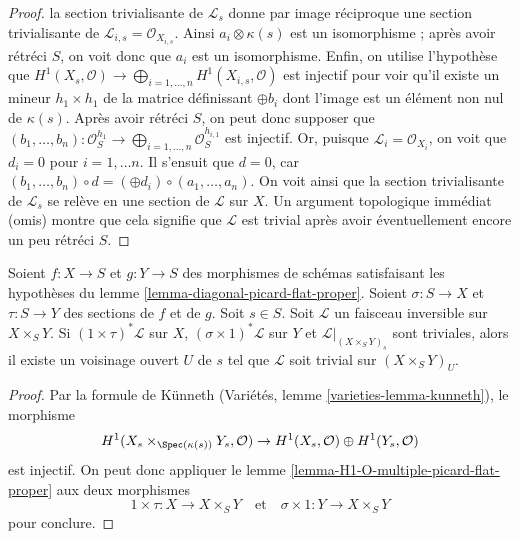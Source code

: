 \begin{proof}
la section trivialisante de $\mathcal{L}_s$ donne par image réciproque une section trivialisante
de $\mathcal{L}_{i, s} = \mathcal{O}_{X_{i, s}}$. Ainsi
$a_i \otimes \kappa(s)$ est un isomorphisme ; après avoir rétréci $S$,
on voit donc que $a_i$ est un isomorphisme. Enfin, on utilise l'hypothèse
que $H^1(X_s, \mathcal{O}) \to
\bigoplus_{i = 1, \ldots, n} H^1(X_{i, s}, \mathcal{O})$
est injectif pour voir qu'il existe un mineur $h_1 \times h_1$ de la
matrice définissant $\oplus b_i$ dont l'image est un élément non nul
de $\kappa(s)$. Après avoir rétréci $S$, on peut donc supposer
que $(b_1, \ldots, b_n) : \mathcal{O}_S^{h_1}
\to \bigoplus_{i = 1, \ldots, n} \mathcal{O}_S^{h_{i, 1}}$
est injectif. Or, puisque $\mathcal{L}_i = \mathcal{O}_{X_i}$,
on voit que $d_i = 0$ pour $i = 1, \ldots n$. Il s'ensuit que $d = 0$,
car $(b_1, \ldots, b_n) \circ d = (\oplus d_i) \circ (a_1, \ldots, a_n)$.
On voit ainsi
que la section trivialisante de $\mathcal{L}_s$ se relève en une section
de $\mathcal{L}$ sur $X$. Un argument topologique immédiat (omis)
montre que cela signifie que $\mathcal{L}$ est trivial après avoir éventuellement
encore un peu rétréci $S$.
\end{proof}

\begin{lemma}
\label{lemma-pic-of-product}
Soient $f : X \to S$ et $g : Y \to S$ des morphismes de schémas
satisfaisant les hypothèses du lemme \ref{lemma-diagonal-picard-flat-proper}.
Soient $\sigma : S \to X$ et $\tau : S \to Y$ des sections de
$f$ et de $g$. Soit $s \in S$.
Soit $\mathcal{L}$ un faisceau inversible sur $X \times_S Y$.
Si $(1 \times \tau)^*\mathcal{L}$ sur $X$, $(\sigma \times 1)^*\mathcal{L}$
sur $Y$ et $\mathcal{L}|_{(X \times_S Y)_s}$ sont triviales, alors
il existe un voisinage ouvert $U$ de $s$ tel que
$\mathcal{L}$ soit trivial sur $(X \times_S Y)_U$.
\end{lemma}

\begin{proof}
Par la formule de K\"unneth (Variétés, lemme \ref{varieties-lemma-kunneth}),
le morphisme
$$
H^1(X_s \times_{\Spec(\kappa(s))} Y_s, \mathcal{O}) \to
H^1(X_s, \mathcal{O}) \oplus H^1(Y_s, \mathcal{O})
$$
est injectif. On peut donc
appliquer le lemme \ref{lemma-H1-O-multiple-picard-flat-proper}
aux deux morphismes
$$
1 \times \tau : X \to X \times_S Y
\quad\text{et}\quad
\sigma \times 1 : Y \to X \times_S Y
$$
pour conclure.
\end{proof}

